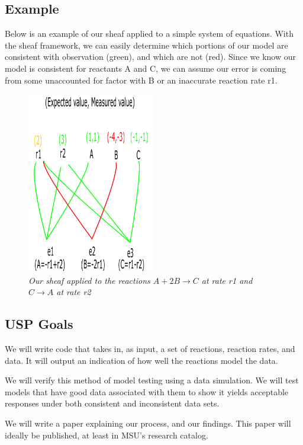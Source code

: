 \documentclass[10.5pt]{article}
\begin{document}
\subsection{Example}
Below is an example of our sheaf applied to a simple system of equations. With the sheaf framework, we can easily determine which portions of our model are consistent with observation (green), and which are not (red). Since we know our model is consistent for reactants A and C, we can assume our error is coming from some unaccounted for factor with B or an inaccurate reaction rate r1.  
\begin{figure}[h]
	\caption{\textit{Our sheaf applied to the reactions $A + 2B\rightarrow C$ at rate r1 and $C \rightarrow A$ at rate r2}}
	
	\centering
	\includegraphics[width=0.5\textwidth, height=0.2\textheight]{USP2019s.PNG}
\end{figure}
\subsection{USP Goals}
We will write code that takes in, as input, a set of reactions, reaction rates, and data. It will output an indication of how well the reactions model the data.

We will verify this method of model testing using a data simulation. We will test models that have good data associated with them to show it yields acceptable responses under both consistent and inconsistent data sets.

We will write a paper explaining our process, and our findings. This paper will ideally be published, at least in MSU's research catalog.
\end{document}
